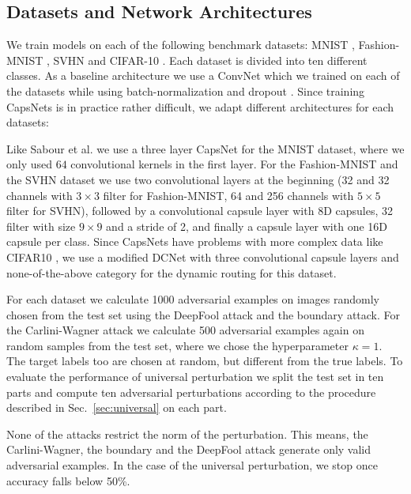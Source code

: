 \documentclass{article}
\begin{document}
\subsection{Datasets and Network Architectures}

We train models on each of the following benchmark datasets: MNIST \cite{mnist}, Fashion-MNIST \cite{fashion}, SVHN \cite{svhn} and CIFAR-10 \cite{cifar}. Each dataset is divided into ten different classes. As a baseline architecture we use a ConvNet which we trained on each of the datasets while using batch-normalization \cite{batchnorm} and dropout \cite{dropout}. Since training CapsNets is in practice rather difficult, we adapt different architectures for each datasets:

Like Sabour et al.  we use a three layer CapsNet for the MNIST dataset, where we only used $64$ convolutional kernels in the first layer. For the Fashion-MNIST and the SVHN dataset we use two convolutional layers at the beginning (32 and 32 channels with $3\times3$ filter for Fashion-MNIST, 64 and 256 channels with $5\times5$ filter for SVHN), followed by a convolutional capsule layer with 8D capsules, 32 filter with size $9\times9$ and a stride of 2, and finally a capsule layer with one 16D capsule per class. Since CapsNets have problems with more complex data like CIFAR10 \cite{complex}, we use a modified DCNet \cite{denseanddiverse} with three convolutional capsule layers and none-of-the-above category for the dynamic routing \cite{capsules} for this dataset.

For each dataset we calculate 1000 adversarial examples on images randomly chosen from the test set using the DeepFool attack and the boundary attack.
For the Carlini-Wagner attack we calculate 500 adversarial examples again on random samples from the test set, where we chose the hyperparameter $\kappa = 1$. The target labels too are chosen at random, but different from the true labels. To evaluate the performance of universal perturbation we split the test set in ten parts and compute ten adversarial perturbations according to the procedure described in Sec.~\ref{sec:universal} on each part.

None of the attacks restrict the norm of the perturbation. This means, the Carlini-Wagner, the boundary and the DeepFool attack generate only valid adversarial examples. In the case of the universal perturbation, we stop once accuracy falls below 50\%.

\end{document}
